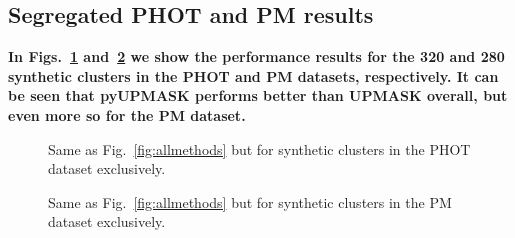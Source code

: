 \documentclass{aa}
\begin{document}
\begin{appendix}
\section{Segregated PHOT and PM results}
 \label{apx:results}

 \textbf{In Figs.~\ref{fig:photvertbars} and~\ref{fig:pmvertbars} we show the
  performance results for the 320 and 280 synthetic clusters in the PHOT and PM
  datasets, respectively. It can be seen that pyUPMASK performs better than
  UPMASK overall, but even more so for the PM dataset.}

 \begin{figure}
 \caption{Same as Fig.~\ref{fig:allmethods} but for synthetic clusters in the
 PHOT dataset exclusively.}
 \label{fig:photvertbars}
 \end{figure}

 \begin{figure}
 \caption{Same as Fig.~\ref{fig:allmethods} but for synthetic clusters in the
 PM dataset exclusively.}
 \label{fig:pmvertbars}
 \end{figure}

\end{appendix}
\end{document}
